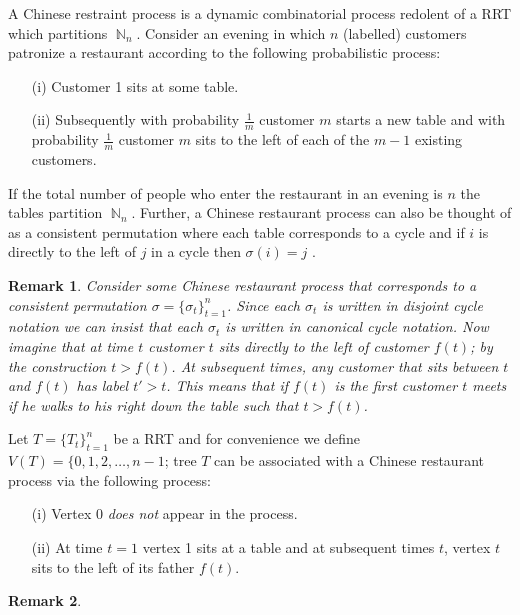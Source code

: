 \documentclass[oneside]{book} %
\newtheorem{remk}{Remark}
\theoremstyle{definition}
\numberwithin{equation}{section}
\DeclareMathOperator{\N}{\mathbb{N}}
\begin{document}
 A Chinese restraint process is a dynamic combinatorial process redolent of a RRT which partitions $\N_n$.  Consider an evening in which $n$ (labelled) customers patronize a restaurant according to the following probabilistic process:
 \begin{itemize}
  \item[(i)] Customer 1 sits at some table. 
  \item[(ii)] Subsequently with probability $\frac{1}{m}$ customer $m$ starts a new table and with probability $\frac{1}{m}$  customer $m$ sits to the left of each of the $m-1$ existing customers.
 \end{itemize}

 If the total number of people who enter the restaurant in an evening is $n$ the tables partition $\N_n$. Further,  a Chinese restaurant process can also be thought of as a consistent  permutation where each table corresponds to a cycle and if $i$ is directly to the left of $j$ in a cycle then $\sigma(i) = j$ \cite{Pitman}.
 
\begin{remk}\label{remk:1}
  Consider some Chinese restaurant process that corresponds to a consistent permutation $\sigma  = \{\sigma_t\}_{t=1}^n$. Since each $\sigma_t$ is written in disjoint cycle notation we can insist that each $\sigma_t$ is written in canonical cycle notation.  Now imagine that at time $t$ customer $t$ sits directly to the left of customer $f(t)$; by the construction $t > f(t)$.  At subsequent times, any customer that sits between $t$ and $f(t)$ has label $t' >t$.  This means that if $f(t)$ is the first customer $t$ meets if he walks to his right down the table such that $t > f(t)$.  
\end{remk}
 
 Let $T = \{T_t\}_{t=1}^{n}$ be a RRT and for convenience we define $V(T) = \{0,1,2,\dots,n-1$; tree $T$ can be associated with a Chinese restaurant process via the following process:
 \begin{itemize}
  \item[(i)] Vertex 0 \emph{does not} appear in the process.
  \item[(ii)] At time $t=1$ vertex 1 sits at a table and at subsequent times $t$, vertex $t$ sits to the left of its father $f(t)$.  
 \end{itemize}

\begin{remk}
 
\end{remk}
 
\end{document}
